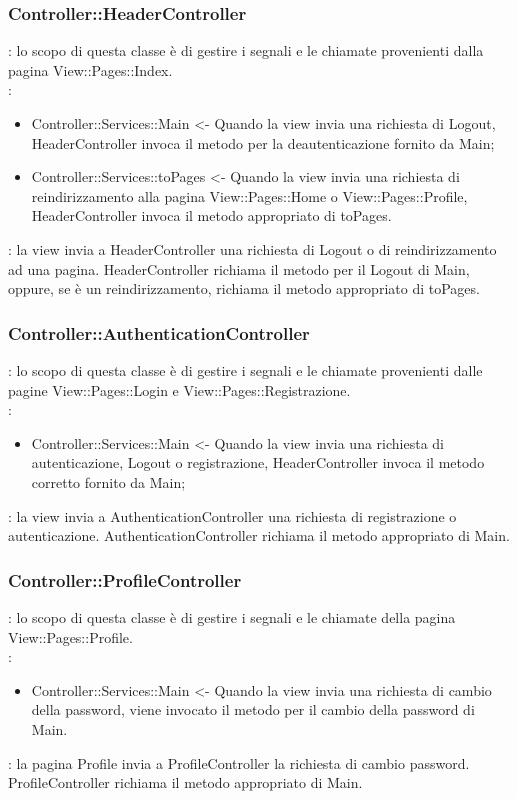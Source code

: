{	\subsubsection{Controller::\-HeaderController}{
		\textbf{\tipo}: lo scopo di questa classe è di gestire i segnali e le chiamate provenienti dalla pagina View::\-Pages::\-Index.\\	
		\textbf{\relaz}:
		\begin{itemize}
			\item Controller::\-Services::\-Main <- Quando la view invia una richiesta di Logout, HeaderController invoca il metodo per la deautenticazione fornito da Main;
			\item Controller::\-Services::\-toPages <- Quando la view invia una richiesta di reindirizzamento alla pagina View::\-Pages::\-Home o View::\-Pages::\-Profile, HeaderController invoca il metodo appropriato di toPages.
		\end{itemize}
		\textbf{\interfacce}: la view invia a HeaderController una richiesta di Logout o di reindirizzamento ad una pagina. HeaderController richiama il metodo per il Logout di Main, oppure, se è un reindirizzamento, richiama il metodo appropriato di toPages.
	}

	\subsubsection{Controller::\-AuthenticationController}{
		\textbf{\tipo}: lo scopo di questa classe è di gestire i segnali e le chiamate provenienti dalle pagine View::\-Pages::\-Login e View::\-Pages::\-Registrazione.\\	
		\textbf{\relaz}:
		\begin{itemize}
			\item Controller::\-Services::\-Main <- Quando la view invia una richiesta di autenticazione, Logout o registrazione, HeaderController invoca il metodo corretto fornito da Main;
		\end{itemize}
		\textbf{\interfacce}: la view invia a AuthenticationController una richiesta di registrazione o autenticazione. AuthenticationController richiama il metodo appropriato di Main.
	}
			
	\subsubsection{Controller::\-ProfileController}{
		\textbf{\tipo}: lo scopo di questa classe è di gestire i segnali e le chiamate della pagina View::\-Pages::\-Profile.\\	
		\textbf{\relaz}:
		\begin{itemize}
			\item Controller::\-Services::\-Main <- Quando la view invia una richiesta di cambio della password, viene invocato il metodo per il cambio della password di Main.
		\end{itemize}
		\textbf{\interfacce}: la pagina Profile invia a ProfileController la richiesta di cambio password. ProfileController richiama il metodo appropriato di Main.
	}

}

